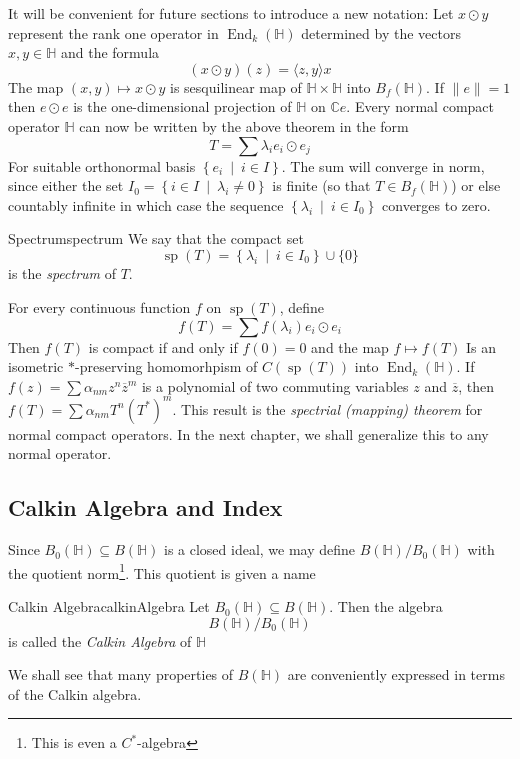 \documentclass[oneside]{book}
\newcommand{\C}{\mathbb{C}}
\renewcommand{\H}{\mathbb{H}}
\newcommand{\sse}{\subseteq}
\newcommand{\oln}{\overline}
\renewcommand{\sp}{\operatorname{sp}}
\newcommand{\End}{\operatorname{End}}
\newcommand{\set}[2]{\left\{#1 \ \middle|\ #2\right\}}
\begin{document}
It will be convenient for future sections to introduce a new notation: Let $x\odot y$ represent the rank one
operator in $\End_k(\H)$ determined by the vectors $x,y \in \H$ and the formula
\[
	(x\odot y)(z) = \langle z, y \rangle x
\]
The map $(x,y) \mapsto x\odot y$ is sesquilinear map of $\H\times \H$ into $B_f(\H)$. If $\|e\| = 1$ then
$e\odot e$ is the one-dimensional projection of $\H$ on $\C e$. Every normal compact operator $\H$ can now be
written by the above theorem in the form
\[
	T = \sum \lambda_i e_i\odot e_j
\]
For suitable orthonormal basis $\set{e_i}{i \in I}$. The sum will converge in norm, since either the set $I_0
= \set{i \in I}{\lambda_i \ne 0}$ is finite (so that $T \in B_f(\H)$) or else countably infinite in which case the
sequence $\set{\lambda_i}{i \in I_0}$ converges to zero.

\begin{defn}{Spectrum}{spectrum}
	We say that the compact set
	\[
		\sp(T) = \set{\lambda_i}{i \in I_0}\cup \{0\}
	\]
	is the \emph{spectrum} of $T$.
\end{defn}

For every continuous function $f$ on $\sp(T)$, define
\[
	f(T) = \sum f(\lambda_i) e_i\odot e_i
\]
Then $f(T)$ is compact if and only if $f(0) = 0$ and the map $f \mapsto f(T)$ Is an isometric $*$-preserving
homomorhpism of $C(\sp(T))$ into $\End_k(\H)$. If $f(z) = \sum \alpha_{nm}z^n\oln{z}^m$ is a polynomial of two
commuting variables $z$ and $\oln{z}$, then $f(T) = \sum \alpha_{nm} T^n(T^{*})^m$. This result is the
\emph{spectrial (mapping) theorem} for normal compact operators. In the next chapter, we shall generalize this to any
normal operator.


\subsection*{Calkin Algebra and Index}


Since $B_0(\H) \sse B(\H)$ is a closed ideal, we may define $B(\H)/B_0(\H)$ with the quotient norm\footnote{This is
even a $C^*$-algebra}. This quotient is given a name

\begin{defn}{Calkin Algebra}{calkinAlgebra}
	Let $B_0(\H)\sse B(\H)$. Then the algebra
	\[
		B(\H)/B_0(\H)
	\]
	is called the \emph{Calkin Algebra} of $\H$
\end{defn}

We shall see that many properties of $B(\H)$ are conveniently expressed in terms of the Calkin algebra.
\end{document}
